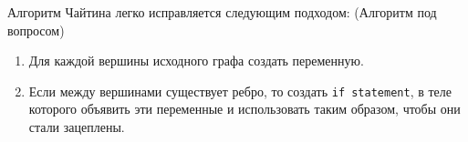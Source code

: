 Алгоритм Чайтина легко исправляется следующим подходом: (Алгоритм под вопросом)

\begin{enumerate} %
    \item Для каждой вершины исходного графа создать переменную.
    \item Если между вершинами существует ребро, то создать \texttt{if statement}, в теле
    которого объявить эти переменные и использовать таким образом, чтобы они стали зацеплены.
\end{enumerate}